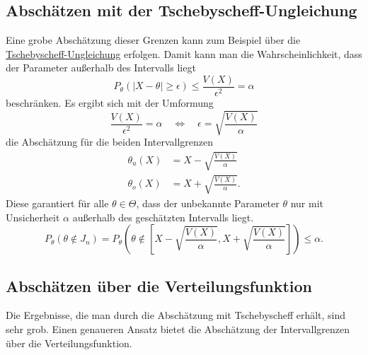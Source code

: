 \subsection{Abschätzen mit der Tschebyscheff-Ungleichung}
Eine grobe Abschätzung dieser Grenzen kann zum Beispiel über die \hyperref[tschebyscheff]{Tschebyscheff-Ungleichung} erfolgen.
Damit kann man die Wahrscheinlichkeit, dass der Parameter außerhalb des Intervalls liegt
\begin{equation*}
	P_\theta(|X-\theta|\geq \epsilon)\leq \frac{V(X)}{\epsilon^2}= \alpha
\end{equation*}
beschränken.
Es ergibt sich mit der Umformung 
\begin{equation*}
	\frac{V(X)}{\epsilon^2}= \alpha \quad \Leftrightarrow \quad \epsilon =\sqrt{\frac{V(X)}{\alpha}}
\end{equation*}
die Abschätzung für die beiden Intervallgrenzen
\begin{align*}
	\theta_u(X)&=X-\sqrt{\frac{V(X)}{\alpha}}\\
	\theta_o(X)&=X+\sqrt{\frac{V(X)}{\alpha}}.
\end{align*}
Diese garantiert für alle $\theta\in\Theta$, dass der unbekannte Parameter $\theta$ nur mit Unsicherheit $\alpha$ außerhalb des geschätzten Intervalls liegt.
\begin{equation*}
	P_\theta(\theta\not\in J_n)=\textstyle P_\theta\left(\theta\not\in \left[ X-\sqrt{\frac{V(X)}{\alpha}},X+\sqrt{\frac{V(X)}{\alpha}}\right]\right)\leq \alpha.
\end{equation*}



\subsection{Abschätzen über die Verteilungsfunktion}
Die Ergebnisse, die man durch die Abschätzung mit Tschebyscheff erhält, sind sehr grob. Einen genaueren Ansatz bietet die Abschätzung der Intervallgrenzen über die Verteilungsfunktion.

